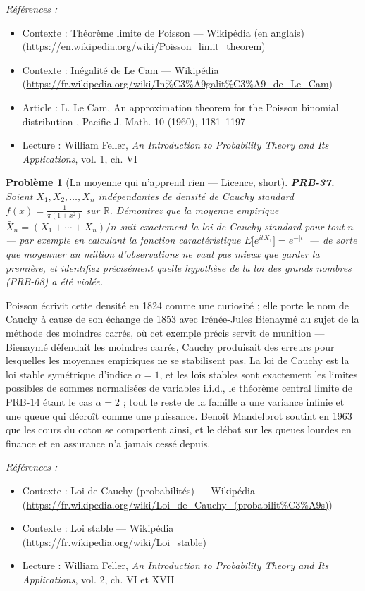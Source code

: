 \documentclass[11pt]{article}
\newtheorem{problem}{Problème}
\newenvironment{refs}{\par\small\noindent\emph{Références :}\begin{itemize}\setlength\itemsep{0pt}}{\end{itemize}\normalsize}
\begin{document}
\begin{refs}
\item Contexte : Théorème limite de Poisson --- Wikipédia (en anglais) (\url{https://en.wikipedia.org/wiki/Poisson_limit_theorem})
\item Contexte : Inégalité de Le Cam --- Wikipédia (\url{https://fr.wikipedia.org/wiki/In%C3%A9galit%C3%A9_de_Le_Cam})
\item Article : L. Le Cam, \og{} An approximation theorem for the Poisson binomial distribution \fg{}, Pacific J. Math. 10 (1960), 1181--1197
\item Lecture : William Feller, \textit{An Introduction to Probability Theory and Its Applications}, vol. 1, ch. VI
\end{refs}

\bigskip

\begin{problem}[{La moyenne qui n'apprend rien --- Licence, short}]
\textbf{PRB-37.} Soient $ X_1, X_2, \dots, X_n $ indépendantes de densité de
Cauchy standard $ f(x) = \frac{1}{\pi(1+x^2)} $ sur $ \mathbb{R} $. Démontrez que la moyenne
empirique $ \bar{X}_n = (X_1 + \cdots + X_n)/n $ suit \textit{exactement} la loi de Cauchy standard
pour tout $ n $ --- par exemple en calculant la fonction caractéristique
$ E\big[e^{itX_1}\big] = e^{-|t|} $ --- de sorte que moyenner un million d'observations ne vaut pas
mieux que garder la première, et identifiez précisément quelle hypothèse de la loi des grands
nombres (PRB-08) a été violée.
\end{problem}

\noindent Poisson écrivit cette densité en 1824 comme une curiosité ; elle porte le nom de
Cauchy à cause de son échange de 1853 avec Irénée-Jules Bienaymé au sujet de la méthode des
moindres carrés, où cet exemple précis servit de munition --- Bienaymé défendait les moindres carrés,
Cauchy produisait des erreurs pour lesquelles les moyennes empiriques ne se stabilisent pas. La loi
de Cauchy est la loi stable symétrique d'indice $ \alpha = 1 $, et les lois stables sont
exactement les limites possibles de sommes normalisées de variables i.i.d., le théorème central
limite de PRB-14 étant le cas $ \alpha = 2 $ ; tout le reste de la famille a une variance infinie
et une queue qui décroît comme une puissance. Benoit Mandelbrot soutint en 1963 que les cours du
coton se comportent ainsi, et le débat sur les queues lourdes en finance et en assurance n'a jamais
cessé depuis.

\begin{refs}
\item Contexte : Loi de Cauchy (probabilités) --- Wikipédia (\url{https://fr.wikipedia.org/wiki/Loi_de_Cauchy_(probabilit%C3%A9s)})
\item Contexte : Loi stable --- Wikipédia (\url{https://fr.wikipedia.org/wiki/Loi_stable})
\item Lecture : William Feller, \textit{An Introduction to Probability Theory and Its Applications}, vol. 2, ch. VI et XVII
\end{refs}
\end{document}
